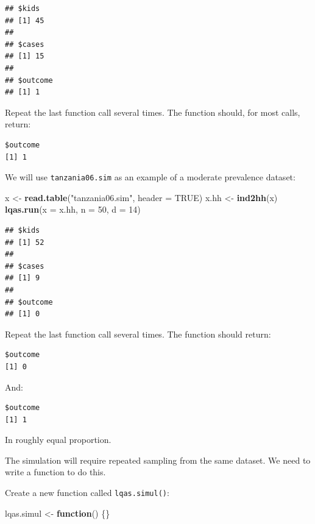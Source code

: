 \documentclass[12pt,a4paper]{book}
\newenvironment{Shaded}{\begin{snugshade}}{\end{snugshade}}
\newcommand{\ControlFlowTok}[1]{\textcolor[rgb]{0.13,0.29,0.53}{\textbf{#1}}}
\newcommand{\DataTypeTok}[1]{\textcolor[rgb]{0.13,0.29,0.53}{#1}}
\newcommand{\DecValTok}[1]{\textcolor[rgb]{0.00,0.00,0.81}{#1}}
\newcommand{\KeywordTok}[1]{\textcolor[rgb]{0.13,0.29,0.53}{\textbf{#1}}}
\newcommand{\NormalTok}[1]{#1}
\newcommand{\OtherTok}[1]{\textcolor[rgb]{0.56,0.35,0.01}{#1}}
\newcommand{\StringTok}[1]{\textcolor[rgb]{0.31,0.60,0.02}{#1}}
\theoremstyle{definition}
\theoremstyle{definition}
\theoremstyle{definition}
\theoremstyle{remark}
\begin{document}
\begin{verbatim}
## $kids
## [1] 45
## 
## $cases
## [1] 15
## 
## $outcome
## [1] 1
\end{verbatim}

Repeat the last function call several times. The function should, for
most calls, return:

\begin{verbatim}
$outcome
[1] 1
\end{verbatim}

We will use \texttt{tanzania06.sim} as an example of a moderate
prevalence dataset:

\begin{Shaded}
\begin{Highlighting}[]
\NormalTok{x <-}\StringTok{ }\KeywordTok{read.table}\NormalTok{(}\StringTok{"tanzania06.sim"}\NormalTok{, }\DataTypeTok{header =} \OtherTok{TRUE}\NormalTok{)}
\NormalTok{x.hh <-}\StringTok{ }\KeywordTok{ind2hh}\NormalTok{(x)}
\KeywordTok{lqas.run}\NormalTok{(}\DataTypeTok{x =}\NormalTok{ x.hh, }\DataTypeTok{n =} \DecValTok{50}\NormalTok{, }\DataTypeTok{d =} \DecValTok{14}\NormalTok{)}
\end{Highlighting}
\end{Shaded}

\begin{verbatim}
## $kids
## [1] 52
## 
## $cases
## [1] 9
## 
## $outcome
## [1] 0
\end{verbatim}

Repeat the last function call several times. The function should return:

\begin{verbatim}
$outcome
[1] 0
\end{verbatim}

And:

\begin{verbatim}
$outcome
[1] 1
\end{verbatim}

In roughly equal proportion.

The simulation will require repeated sampling from the same dataset. We
need to write a function to do this.

Create a new function called \texttt{lqas.simul()}:

\begin{Shaded}
\begin{Highlighting}[]
\NormalTok{lqas.simul <-}\StringTok{ }\ControlFlowTok{function}\NormalTok{() \{\}}
\end{Highlighting}
\end{Shaded}
\end{document}
